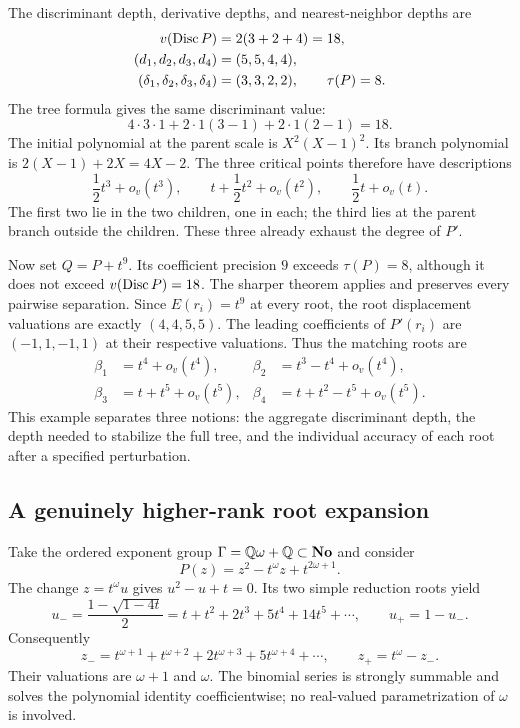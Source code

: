 \documentclass[11pt,letterpaper,oneside]{article}
\numberwithin{equation}{section}
\theoremstyle{definition}
\theoremstyle{remark}\newtheorem{remark}[theorem]{Remark}
\newcommand{\No}{\mathbf{No}}\newcommand{\SC}{\mathbf{SC}}
\begin{document}
The discriminant depth, derivative depths, and nearest-neighbor depths
are
\begin{align*}
 v(\operatorname{Disc} P)&=2(3+2+4)=18,\\
 (d_1,d_2,d_3,d_4)&=(5,5,4,4),\\
 (\delta_1,\delta_2,\delta_3,\delta_4)&=(3,3,2,2),
 \qquad \tau(P)=8.
\end{align*}
The tree formula gives the same discriminant value:
\[
 4\cdot3\cdot1+2\cdot1(3-1)+2\cdot1(2-1)=18.
\]
The initial polynomial at the parent scale is $X^2(X-1)^2$.
Its branch polynomial is $2(X-1)+2X=4X-2$. The three critical points
therefore have descriptions
\begin{equation}\label{eq:quarticcritical}
 \frac12t^3+o_v(t^3),\qquad
 t+\frac12t^2+o_v(t^2),\qquad
 \frac12t+o_v(t).
\end{equation}
The first two lie in the two children, one in each; the third lies at
the parent branch outside the children. These three already exhaust
the degree of $P'$.

Now set $Q=P+t^9$. Its coefficient precision $9$ exceeds $\tau(P)=8$,
although it does not exceed $v(\operatorname{Disc} P)=18$. The sharper theorem applies
and preserves every pairwise separation. Since $E(r_i)=t^9$ at every
root, the root displacement valuations are exactly $(4,4,5,5)$.
The leading coefficients of $P'(r_i)$ are $(-1,1,-1,1)$ at their
respective valuations. Thus the matching roots are
\begin{align*}
 \beta_1&=t^4+o_v(t^4),&
 \beta_2&=t^3-t^4+o_v(t^4),\\
 \beta_3&=t+t^5+o_v(t^5),&
 \beta_4&=t+t^2-t^5+o_v(t^5).
\end{align*}
This example separates three notions: the aggregate discriminant depth,
the depth needed to stabilize the full tree, and the individual accuracy
of each root after a specified perturbation.

\subsection{A genuinely higher-rank root expansion}\label{subsec:highrank}
Take the ordered exponent group $\Gamma=\Q\omega+\Q\subset\No$ and
consider
\begin{equation}\label{eq:highrankpoly}
 P(z)=z^2-t^\omega z+t^{2\omega+1}.
\end{equation}
The change $z=t^\omega u$ gives $u^2-u+t=0$. Its two simple reduction
roots yield
\[
 u_- =\frac{1-\sqrt{1-4t}}2
 =t+t^2+2t^3+5t^4+14t^5+\cdots,
 \qquad u_+=1-u_-.
\]
Consequently
\begin{equation}\label{eq:highrankroots}
 z_-=t^{\omega+1}+t^{\omega+2}+2t^{\omega+3}+5t^{\omega+4}+\cdots,
 \qquad z_+=t^\omega-z_-.
\end{equation}
Their valuations are $\omega+1$ and $\omega$. The binomial series is
strongly summable and solves the polynomial identity coefficientwise;
no real-valued parametrization of $\omega$ is involved.
\end{document}
